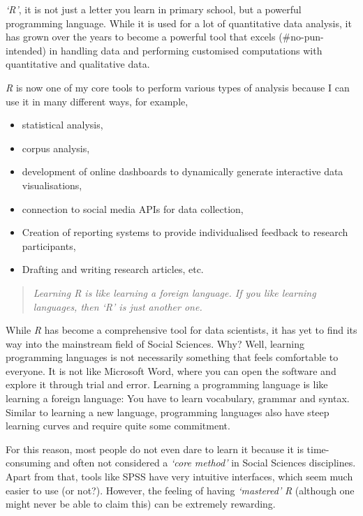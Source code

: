 \documentclass[
]{book}
\providecommand{\tightlist}{%
  \setlength{\itemsep}{0pt}\setlength{\parskip}{0pt}}
\begin{document}
\emph{`R'}, it is not just a letter you learn in primary school, but a powerful programming language. While it is used for a lot of quantitative data analysis, it has grown over the years to become a powerful tool that excels (\#no-pun-intended) in handling data and performing customised computations with quantitative and qualitative data.

\emph{R} is now one of my core tools to perform various types of analysis because I can use it in many different ways, for example,

\begin{itemize}
\tightlist
\item
  statistical analysis,
\item
  corpus analysis,
\item
  development of online dashboards to dynamically generate interactive data visualisations,
\item
  connection to social media APIs for data collection,
\item
  Creation of reporting systems to provide individualised feedback to research participants,
\item
  Drafting and writing research articles, etc.
\end{itemize}

\begin{quote}
\emph{Learning R is like learning a foreign language. If you like learning languages, then `R' is just another one.}
\end{quote}

While \emph{R} has become a comprehensive tool for data scientists, it has yet to find its way into the mainstream field of Social Sciences. Why? Well, learning programming languages is not necessarily something that feels comfortable to everyone. It is not like Microsoft Word, where you can open the software and explore it through trial and error. Learning a programming language is like learning a foreign language: You have to learn vocabulary, grammar and syntax. Similar to learning a new language, programming languages also have steep learning curves and require quite some commitment.

For this reason, most people do not even dare to learn it because it is time-consuming and often not considered a \emph{`core method'} in Social Sciences disciplines. Apart from that, tools like SPSS have very intuitive interfaces, which seem much easier to use (or not?). However, the feeling of having \emph{`mastered'} \emph{R} (although one might never be able to claim this) can be extremely rewarding.
\end{document}
